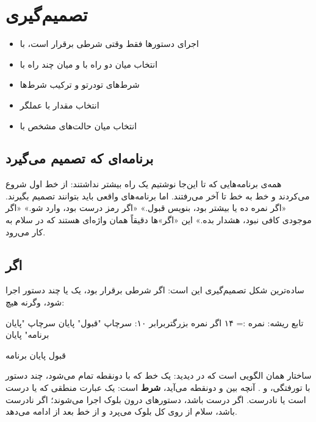 \chapter{تصمیم‌گیری}\label{ch:conditions}

\begin{goals}
\begin{itemize}
  \item اجرای دستورها فقط وقتی شرطی برقرار است، با 
  \item انتخاب میان دو راه با  و میان چند راه با
  \item شرط‌های تودرتو و ترکیب شرط‌ها
  \item انتخاب مقدار با عملگر 
  \item انتخاب میان حالت‌های مشخص با 
\end{itemize}
\end{goals}

\section{برنامه‌ای که تصمیم می‌گیرد}

همه‌ی برنامه‌هایی که تا این‌جا نوشتیم یک راه بیشتر نداشتند: از خط اول شروع
می‌کردند و خط به خط تا آخر می‌رفتند. اما برنامه‌های واقعی باید بتوانند
تصمیم بگیرند. «اگر نمره ده یا بیشتر بود، بنویس قبول.» «اگر رمز درست بود،
وارد شو.» «اگر موجودی کافی نبود، هشدار بده.» این «اگر»ها دقیقاً همان
واژه‌ای هستند که در سلام به کار می‌رود.

\section{اگر}

ساده‌ترین شکل تصمیم‌گیری این است: اگر شرطی برقرار بود، یک یا چند دستور
اجرا شود، وگرنه هیچ:

\begin{salamfa}
تابع ریشه:
    نمره := ۱۴
    اگر نمره بزرگتربرابر ۱۰:
        سرچاپ "قبول"
    پایان
    سرچاپ "پایان برنامه"
پایان
\end{salamfa}

\begin{outputfa}
قبول
پایان برنامه
\end{outputfa}

ساختار  همان الگویی است که در  دیدید: یک خط که
با دونقطه تمام می‌شود، چند دستور با تورفتگی، و . آنچه بین
 و دونقطه می‌آید، \textbf{شرط} است: یک عبارت منطقی که یا درست
است یا نادرست. اگر درست باشد، دستورهای درون بلوک اجرا می‌شوند؛ اگر نادرست
باشد، سلام از روی کل بلوک می‌پرد و از خط بعد از  ادامه می‌دهد.

